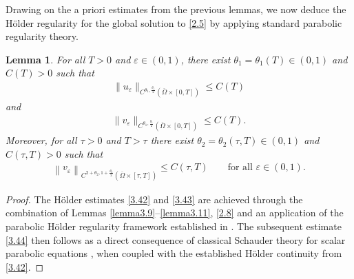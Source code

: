 \documentclass[12pt]{article}
\theoremstyle{plain}
\newtheorem{lemma}{Lemma}[section]
\theoremstyle{definition}
\numberwithin{equation}{section}
\begin{document}
Drawing on the a priori estimates from the previous lemmas, we now deduce the
 H\"{o}lder regularity for the global solution to \eqref{2.5} by applying standard parabolic regularity theory.
\begin{lemma}\label{lemma3.13}
For all $T>0$ and
$\varepsilon\in(0,1)$, there exist $\theta_1=\theta_1(T)\in(0,1)$ and $C(T)>0$ such that
\begin{align}\label{3.42}
   \|u_{\varepsilon}\|_{C^{\theta_1,\frac{\theta_1}{2}}(\overline{\Omega}\times[0,T])} \leq C(T)
\end{align}
and
\begin{align}\label{3.43}
    \|v_{\varepsilon}\|_{C^{\theta_1,\frac{\theta_1}{2}}(\overline{\Omega}\times[0,T])} \leq C(T).
\end{align}
Moreover, for all $\tau>0$ and $T>\tau$ there exist $\theta_2=\theta_2(\tau,T)\in(0,1)$ and $C(\tau,T)>0$ such that
\begin{align}\label{3.44}
    \left\|v_{\varepsilon}\right\|_{C^{2+\theta_2,1+\frac{\theta_2}{2}}(\overline{\Omega}\times[\tau,T])}\leq C(\tau,T)\qquad\text{for all }\varepsilon\in(0,1).
\end{align}
\end{lemma}
\begin{proof}
   The H\"{o}lder estimates \eqref{3.42} and \eqref{3.43} are achieved through  the combination of Lemmas \ref{lemma3.9}--\ref{lemma3.11}, \eqref{2.8} and an application of the parabolic H\"{o}lder regularity framework established in \cite[Theorem 1.3; Remark 1.4]{Holder}. The subsequent estimate \eqref{3.44} then follows as a direct consequence of classical Schauder theory for scalar parabolic equations \cite[Chapter IV]{Schauder}, when coupled with the established H\"{o}lder continuity from \eqref{3.42}.
\end{proof}
\end{document}

